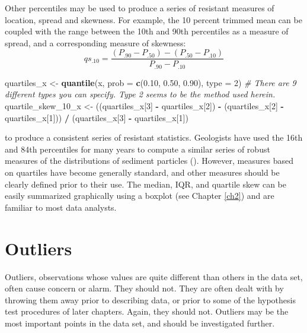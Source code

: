 \documentclass[]{book}
\newenvironment{Shaded}{\begin{snugshade}}{\end{snugshade}}
\newcommand{\CommentTok}[1]{\textcolor[rgb]{0.56,0.35,0.01}{\textit{#1}}}
\newcommand{\DataTypeTok}[1]{\textcolor[rgb]{0.13,0.29,0.53}{#1}}
\newcommand{\DecValTok}[1]{\textcolor[rgb]{0.00,0.00,0.81}{#1}}
\newcommand{\FloatTok}[1]{\textcolor[rgb]{0.00,0.00,0.81}{#1}}
\newcommand{\KeywordTok}[1]{\textcolor[rgb]{0.13,0.29,0.53}{\textbf{#1}}}
\newcommand{\NormalTok}[1]{#1}
\newcommand{\OperatorTok}[1]{\textcolor[rgb]{0.81,0.36,0.00}{\textbf{#1}}}
\newcommand{\StringTok}[1]{\textcolor[rgb]{0.31,0.60,0.02}{#1}}
\begin{document}
Other percentiles may be used to produce a series of resistant measures of location, spread and skewness. For example, the 10 percent trimmed mean can be coupled with the range between the 10th and 90th percentiles as a measure of spread, and a corresponding measure of skewness:
\begin{equation}
qs_{.10} = \frac{(P_{.90}-P_{.50})-(P_{.50}-P_{.10})}{P_{.90}-P_{.10}}
\label{eq:1-12}
\end{equation}

\begin{Shaded}
\begin{Highlighting}[]
\NormalTok{quartiles_x <-}\StringTok{ }\KeywordTok{quantile}\NormalTok{(x, }\DataTypeTok{prob =} \KeywordTok{c}\NormalTok{(}\FloatTok{0.10}\NormalTok{, }\FloatTok{0.50}\NormalTok{, }\FloatTok{0.90}\NormalTok{), }\DataTypeTok{type =} \DecValTok{2}\NormalTok{)}
\CommentTok{# There are 9 different types you can specify. Type 2 seems to be the method used herein.}
\NormalTok{quartile_skew_}\DecValTok{10}\NormalTok{_x <-}\StringTok{ }\NormalTok{((quartiles_x[}\DecValTok{3}\NormalTok{] }\OperatorTok{-}\StringTok{ }\NormalTok{quartiles_x[}\DecValTok{2}\NormalTok{]) }\OperatorTok{-}\StringTok{ }\NormalTok{(quartiles_x[}\DecValTok{2}\NormalTok{] }\OperatorTok{-}\StringTok{ }\NormalTok{quartiles_x[}\DecValTok{1}\NormalTok{])) }\OperatorTok{/}\StringTok{ }\NormalTok{(quartiles_x[}\DecValTok{3}\NormalTok{] }\OperatorTok{-}\StringTok{ }\NormalTok{quartiles_x[}\DecValTok{1}\NormalTok{])}
\end{Highlighting}
\end{Shaded}

to produce a consistent series of resistant statistics. Geologists have used the 16th and 84th percentiles for many years to compute a similar series of robust measures of the distributions of sediment particles (\citet{inman_measures_1952}). However, measures based on quartiles have become generally standard, and other measures should be clearly defined prior to their use. The median, IQR, and quartile skew can be easily summarized graphically using a boxplot (see Chapter \ref{ch2}) and are familiar to most data analysts.

\hypertarget{outliers}{%
\section{Outliers}\label{outliers}}

Outliers, observations whose values are quite different than others in the data set, often cause concern or alarm. They should not. They are often dealt with by throwing them away prior to describing data, or prior to some of the hypothesis test procedures of later chapters. Again, they should not. Outliers may be the most important points in the data set, and should be investigated further.
\end{document}
